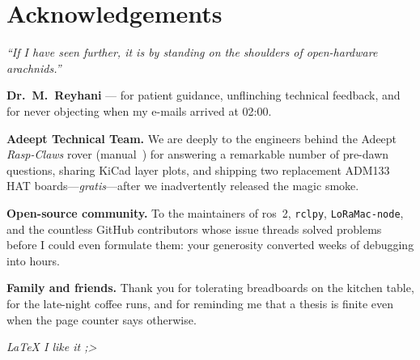 \chapter*{Acknowledgements}

\begin{flushright}
\textit{“If I have seen further, it is by standing on the shoulders of
open-hardware arachnids.”} %
\end{flushright}

\vspace{1em}

\textbf{Dr.\ M.~Reyhani} — for patient guidance, unflinching
technical feedback, and for never objecting when my e-mails arrived at
02:00.


\medskip
\textbf{Adeept Technical Team.}
We are deeply  to the engineers behind the Adeept
\emph{Rasp-Claws} rover (manual~\cite{adeeptRaspClawsManual})
for answering a remarkable number of pre-dawn questions, sharing KiCad
layer plots, and shipping two replacement ADM133 HAT boards—\emph{gratis}—after we inadvertently released the magic smoke.

\medskip
\textbf{Open-source community.}
To the maintainers of \gls{ros}~2, \texttt{rclpy}, \texttt{LoRaMac-node}, and
the countless GitHub contributors whose issue threads solved problems
before I could even formulate them: your generosity converted weeks of
debugging into hours.


\medskip
\textbf{Family and friends.}
Thank you for tolerating breadboards on the kitchen table, for the
late-night coffee runs, and for reminding me that a thesis is finite
even when the page counter says otherwise.

\medskip
\noindent\textit{\LaTeX{} I like it ;\textgreater}